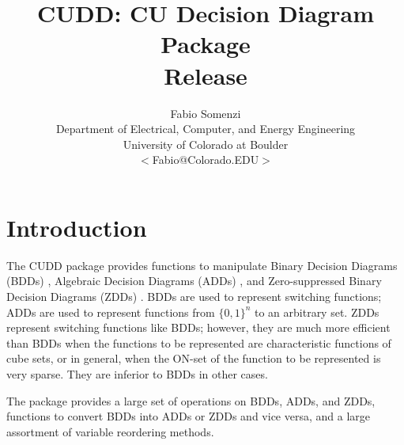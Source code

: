 \documentclass[11pt]{article}
\title{CUDD: CU Decision Diagram Package\\Release \vnumber}
\author{Fabio Somenzi\\
Department of Electrical, Computer, and Energy Engineering\\
University of Colorado at Boulder\\
$<$Fabio@Colorado.EDU$>$}
\begin{document}

\maketitle

\tableofcontents
\clearpage

\section{Introduction}
\label{sec:intro}

The CUDD package provides functions to manipulate Binary Decision
Diagrams (BDDs) \cite{BDD,BBR},
Algebraic Decision Diagrams (ADDs)
\cite{Bahar93}, and Zero-suppressed Binary Decision
Diagrams (ZDDs)
\cite{Minato93}. BDDs are used to represent
switching functions; ADDs are used to
represent functions from $\{0,1\}^n$ to an arbitrary set.  ZDDs
represent switching functions like BDDs;
however, they are much more efficient than BDDs when the functions to
be represented are characteristic
functions of cube sets, or in general, when the
ON-set of the function to be represented is
very sparse. They are inferior to BDDs in other cases.

The package provides a large set of operations on BDDs, ADDs, and
ZDDs, functions to convert BDDs into ADDs or ZDDs and vice versa, and
a large assortment of variable reordering methods.
\end{document}
